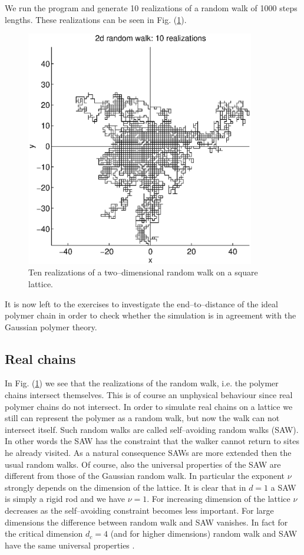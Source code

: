 We run the program and generate 10 realizations of a random walk
of 1000 steps lengths. These realizations can be seen in Fig. 
(\ref{F_RW_2D}).
\begin{figure}
\label{F_RW_2D}
\includegraphics[width=10cm]{./Figures/f_rw_2d.eps}
\caption{Ten realizations of a two--dimensional random walk on a square
lattice.}
\end{figure}
It is now left to the exercises to
investigate the end--to--distance of the
ideal polymer chain in order to check whether the simulation is in 
agreement with the Gaussian polymer theory.


\subsection{Real chains}
In Fig. (\ref{F_RW_2D}) we see that the realizations of the random walk, i.e. 
the polymer chains intersect themselves. This is of course an 
unphysical behaviour since real polymer chains do not intersect.
In order to simulate real chains on a lattice we still can 
represent  the polymer as a random walk, but now the walk can not 
intersect itself. Such random walks are called self--avoiding 
random walks (SAW). In other words the SAW has the constraint that 
the walker cannot return to sites he already visited. As a natural 
consequence SAWs are more extended then the usual random walks. Of 
course, also the universal properties of the SAW are different 
from those of the Gaussian random walk. In particular the exponent
$\nu$ strongly depends on the dimension of the lattice. It is 
clear that in $d=1$ a SAW is simply a rigid rod and we have 
$\nu=1$. For increasing dimension of the lattice $\nu$ 
decreases as the self--avoiding constraint becomes less important. 
For large dimensions the difference between random walk and SAW 
vanishes. In fact for the critical dimension $d_c =4$ (and for higher
dimensions) random walk 
and SAW have the same universal properties \cite{DE_GENNES,RAPOSO}. 

